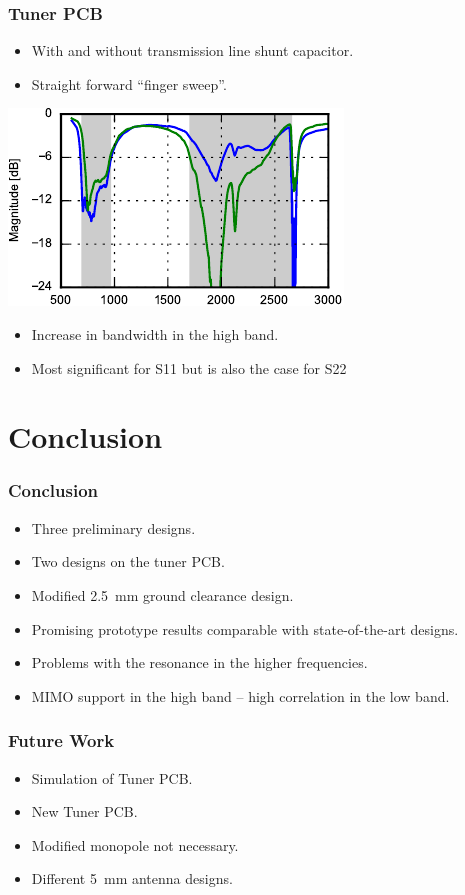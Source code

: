 \begin{frame}
  \frametitle{Tuner PCB}
  \begin{itemize}
  \item With and without transmission line shunt capacitor.
  \item Straight forward ``finger sweep''.
  \end{itemize}
\begin{center}
    \includegraphics[scale=1.4]{img/Lasse/tuner_pcb/003_s11top.pdf}
\end{center}
\begin{itemize}
\item Increase in bandwidth in the high band.
\item Most significant for S11 but is also the case for S22 
\end{itemize}
\legendfooter
\end{frame}

\section{Conclusion}
\begin{frame}
  \frametitle{Conclusion}
      \begin{itemize}
      \item Three preliminary designs.
      \item Two designs on the tuner PCB.
      \item Modified \SI{2.5}{mm} ground clearance design.
    \item Promising prototype results comparable with state-of-the-art designs.
    \item Problems with the resonance in the higher frequencies.
    \item MIMO support in the high band -- high correlation in the low band.
      \end{itemize}
\end{frame}

\begin{frame}
  \frametitle{Future Work}
      \begin{itemize}
      \item Simulation of Tuner PCB.
      \item New Tuner PCB.
      \item Modified monopole not necessary. 
      \item Different \SI{5}{mm} antenna designs.
      \end{itemize}
\end{frame}

